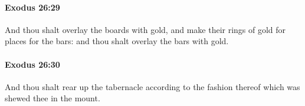 		\paragraph{Exodus 26:29} %
			\label{EXODUS-26-29}

			And thou shalt overlay the boards with gold, and make their rings of gold for places for the bars: and thou shalt overlay the bars with gold.


		\paragraph{Exodus 26:30} %
			\label{EXODUS-26-30}

			And thou shalt rear up the tabernacle according to the fashion thereof which was shewed thee in the mount.


